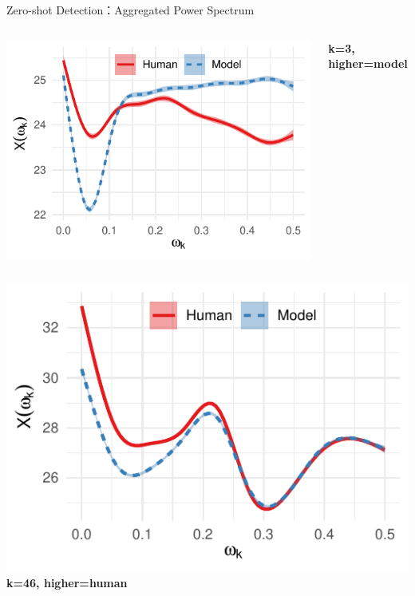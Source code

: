 \documentclass[serif]{beamer}
\begin{document}
\begin{frame}{Zero-shot Detection：Aggregated Power Spectrum}
\begin{columns}[t]
    \centering
    \includegraphics[width=\linewidth]{images/eng_wp_aggregated.pdf}
    
    {\scriptsize \textbf{k=3, higher=model}}
\end{columns}

\vspace{0.3cm}

\begin{columns}[t]
    \centering
    \includegraphics[width=\linewidth]{images/zh_news_aggregated.pdf}
    {\scriptsize \textbf{k=46, higher=human}}


\end{columns}
\end{frame}
\end{document}
